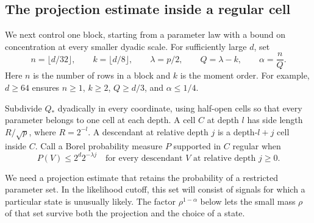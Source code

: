 \subsection{The projection estimate inside a regular cell}
\label{subsec:l-lt-projection}

We next control one block, starting from a parameter law with a bound
on concentration at every smaller dyadic scale.  For sufficiently
large $d$, set
\begin{equation}\label{l:lt:parameters}
 n=\lfloor d/32\rfloor,\qquad
 k=\lfloor d/8\rfloor,\qquad
 \lambda=p/2,\qquad Q=\lambda-k,\qquad \alpha=\frac nQ.
\end{equation}
Here $n$ is the number of rows in a block and $k$ is the moment order.
For example, $d\ge64$ ensures $n\ge1$, $k\ge2$,
$Q\ge d/3$, and $\alpha\le1/4$.

Subdivide $Q_*$ dyadically in every coordinate, using half-open cells
so that every parameter belongs to one cell at each depth.  A cell
$C$ at depth $l$ has side length $R/\sqrt p$, where $R=2^{-l}$.
A descendant at relative depth $j$ is a depth-$l+j$ cell inside $C$.
Call a Borel probability measure $P$ supported in $C$ regular when
\begin{equation}\label{l:lt:regular}
 P(V)\le2^d2^{-\lambda j}
 \quad\text{for every descendant $V$ at relative depth $j\ge0$}.
\end{equation}

We need a projection estimate that retains the probability of a
restricted parameter set.  In the likelihood cutoff, this set will
consist of signals for which a particular state is unusually likely.
The factor $\rho^{1-\alpha}$ below lets the small mass $\rho$ of
that set survive both the projection and the choice of a state.


